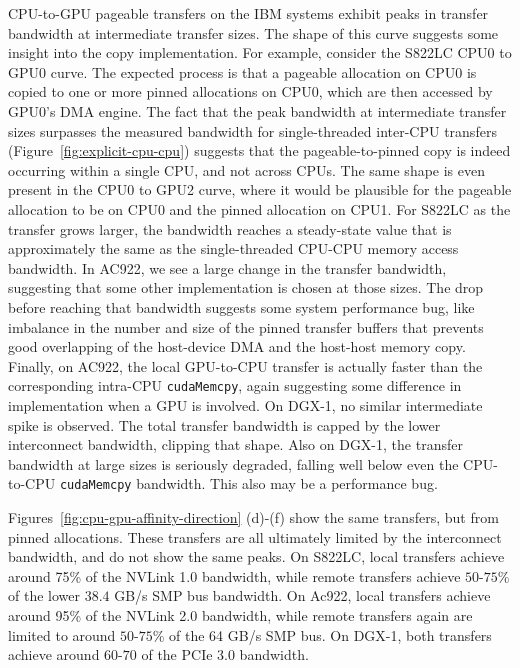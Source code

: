 CPU-to-GPU pageable transfers on the IBM systems exhibit peaks in transfer bandwidth at intermediate transfer sizes.
The shape of this curve suggests some insight into the copy implementation.
For example, consider the S822LC CPU0 to GPU0 curve.
The expected process is that a pageable allocation on CPU0 is copied to one or more pinned allocations on CPU0, which are then accessed by GPU0's DMA engine.
The fact that the peak bandwidth at intermediate transfer sizes surpasses the measured bandwidth for single-threaded inter-CPU transfers (Figure~\ref{fig:explicit-cpu-cpu}) suggests that the pageable-to-pinned copy is indeed occurring within a single CPU, and not across CPUs.
The same shape is even present in the CPU0 to GPU2 curve, where it would be plausible for the pageable allocation to be on CPU0 and the pinned allocation on CPU1.
For S822LC as the transfer grows larger, the bandwidth reaches a steady-state value that is approximately the same as the single-threaded CPU-CPU memory access bandwidth.
In AC922, we see a large change in the transfer bandwidth, suggesting that some other implementation is chosen at those sizes.
The drop before reaching that bandwidth suggests some system performance bug, like imbalance in the number and size of the pinned transfer buffers that prevents good overlapping of the host-device DMA and the host-host memory copy.
Finally, on AC922, the local GPU-to-CPU transfer is actually faster than the corresponding intra-CPU \texttt{cudaMemcpy}, again suggesting some difference in implementation when a GPU is involved.
On DGX-1, no similar intermediate spike is observed.
The total transfer bandwidth is capped by the lower interconnect bandwidth, clipping that shape.
Also on DGX-1, the transfer bandwidth at large sizes is seriously degraded, falling well below even the CPU-to-CPU \texttt{cudaMemcpy} bandwidth.
This also may be a performance bug.

Figures~\ref{fig:cpu-gpu-affinity-direction} (d)-(f) show the same transfers, but from pinned allocations.
These transfers are all ultimately limited by the interconnect bandwidth, and do not show the same peaks.
On S822LC, local transfers achieve around 75\% of the NVLink 1.0 bandwidth, while remote transfers achieve $50$-$75$\% of the lower $38.4$ GB/s SMP bus bandwidth.
On Ac922, local transfers achieve around 95\% of the NVLink 2.0 bandwidth, while remote transfers again are limited to around $50$-$75$\% of the 64 GB/s SMP bus.
On DGX-1, both transfers achieve around $60$-$70$ of the PCIe 3.0 bandwidth.

